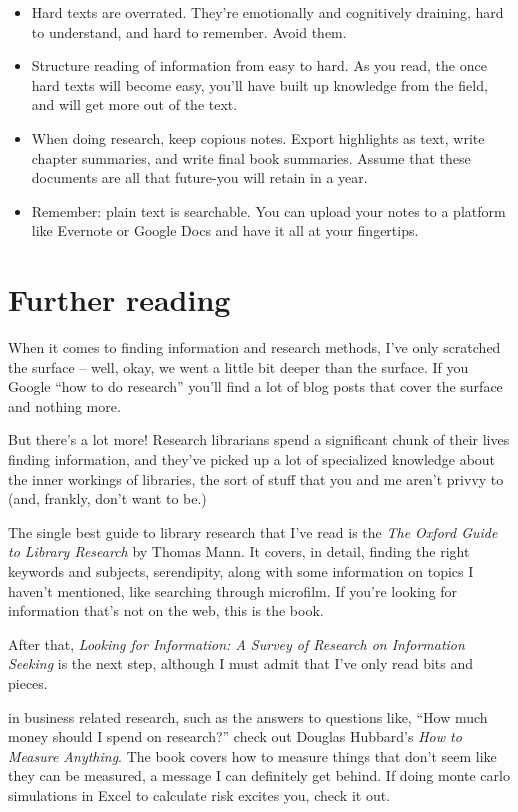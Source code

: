 \begin{itemize}
\item Hard texts are overrated. They're emotionally and cognitively draining, hard to
understand, and hard to remember. Avoid them.

\item Structure reading of information from easy to hard. As you read, the once hard
texts will become easy, you'll have built up knowledge from the field, and will
get more out of the text.

\item When doing research, keep copious notes. Export highlights as text, write
chapter summaries, and write final book summaries. Assume that these documents
are all that future-you will retain in a year.

\item Remember: plain text is searchable. You can upload your notes to a platform
like Evernote or Google Docs and have it all at your fingertips.
\end{itemize}

\section{Further reading}

When it comes to finding information and research methods, I've only scratched
the surface -- well, okay, we went a little bit deeper than the surface. If you
Google ``how to do research'' you'll find a lot of blog posts that cover the
surface and nothing more.

But there's a lot more! Research librarians spend a significant chunk of their
lives finding information, and they've picked up a lot of specialized
knowledge about the inner workings of libraries, the sort of stuff that you and
me aren't privvy to (and, frankly, don't want to be.)

The single best guide to library research that I've read is the \textit{The
  Oxford Guide to Library Research} by Thomas Mann. It covers, in detail,
finding the right keywords and subjects, serendipity, along with some
information on topics I haven't mentioned, like searching through
microfilm. If you're looking for information that's not on the web, this is the
book.

After that, \textit{Looking for Information: A Survey of Research on Information
  Seeking} is the next step, although I must admit that I've only read bits and
pieces.

 in business related research, such as the
answers to questions like, ``How much money should I spend on research?'' check
out Douglas Hubbard's \textit{How to Measure Anything}. The book covers how to
measure things that don't seem like they can be measured, a message I can
definitely get behind. If doing monte carlo simulations in Excel to calculate
risk excites you, check it out.

